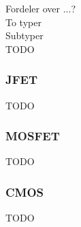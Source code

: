 Fordeler over ...? \\
To typer \\
Subtyper \\
TODO

\subsubsection{JFET}
TODO

\subsubsection{MOSFET}
TODO

\subsubsection{CMOS}
TODO
